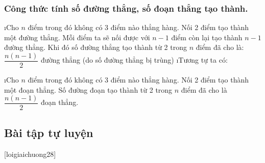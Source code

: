 \subsubsection{Công thức tính số đường thẳng, số đoạn thẳng tạo thành.}
\begin{enumerate}[--,leftmargin=*]
\i Cho $n$ điểm trong đó không có 3 điểm nào thẳng hàng. Nối 2 điểm tạo thành một đường thẳng. Mỗi điểm ta sẽ nối được với $n-1$ điểm còn lại tạo thành $n-1$ đường thẳng.
Khi đó số đường thẳng tạo thành từ 2 trong $n$ điểm đã cho là: $\dfrac{n(n-1)}{2}$  đường thẳng  (do số đường thẳng bị trùng)	
\i Tương tự ta có: 
\begin{enumerate}[+,leftmargin=*]
	\i Cho $n$ điểm trong đó không có 3 điểm nào thẳng hàng. Nối 2 điểm tạo thành một đoạn thẳng. Số đường đoạn tạo thành từ 2 trong $n$ điểm đã cho là $\dfrac{n(n-1)}{2}$ đoạn thẳng.
\end{enumerate}
\end{enumerate}
\subsection{Bài tập tự luyện}
[loigiaichuong28]
